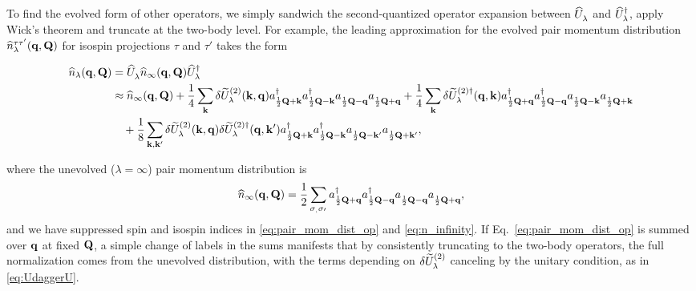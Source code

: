 \documentclass[10pt,aps,prc,floatfix,twocolumn,nofootinbib]{revtex4-1}
\begin{document}
To find the evolved form of other operators, we simply sandwich the second-quantized operator expansion between $\Uhatlam$ and $\widehat U_{\lambda}^{\dagger}$, apply Wick's theorem and truncate at the two-body level.
%
For example, the leading approximation for the evolved pair momentum distribution $\widehat{n}_{\lambda}^{\tau\tau'}(\mathbf{q},\mathbf{Q})$ for isospin projections $\tau$ and $\tau'$ takes the form
\begin{widetext}
%
\begin{align} \label{eq:pair_mom_dist_op}
     \nhatlo(\qvec,\Qvec) &=
    \Uhatlam\nhathi(\qvec,\Qvec)\Uhatlamdag \notag \\
    &\approx \nhathi(\qvec,\Qvec) 
    + \frac14\sum_{\kvec} \delUtilde^{(2)}_\lambda(\kvec,\qvec)
    \akdag_{\frac{1}{2}\Qvec + \kvec} \akdag_{\frac{1}{2}\Qvec - \kvec} 
    \ak_{\frac{1}{2}\Qvec - \qvec} \ak_{\frac{1}{2}\Qvec + \qvec}
    + \frac14\sum_{\kvec} \delUtilde^{(2)\dagger}_\lambda(\qvec,\kvec)
    \akdag_{\frac{1}{2}\Qvec + \qvec} \akdag_{\frac{1}{2}\Qvec - \qvec} 
    \ak_{\frac{1}{2}\Qvec - \kvec} \ak_{\frac{1}{2}\Qvec + \kvec} \notag \\
    & \quad \null + \frac18 \sum_{\kvec,\kvec'} \delUtilde^{(2)}_\lambda(\kvec,\qvec)\delUtilde^{(2)\dagger}_\lambda(\qvec,\kvec')
    \akdag_{\frac{1}{2}\Qvec + \kvec} \akdag_{\frac{1}{2}\Qvec - \kvec} 
    \ak_{\frac{1}{2}\Qvec - \kvec'} \ak_{\frac{1}{2}\Qvec + \kvec'},
\end{align}
\end{widetext}
%
where the unevolved ($\lambda = \infty$) pair momentum distribution is
%
\begin{equation} \label{eq:n_infinity}
    \nhathi(\qvec,\Qvec) = 
       \frac{1}{2}\sum_{\sg,\sg'} \akdag_{\frac{1}{2}\Qvec + \qvec} \akdag_{\frac{1}{2}\Qvec - \qvec} 
    \ak_{\frac{1}{2}\Qvec - \qvec} \ak_{\frac{1}{2}\Qvec + \qvec},
\end{equation}
%
and we have suppressed spin and isospin indices in \eqref{eq:pair_mom_dist_op} and \eqref{eq:n_infinity}.
If Eq.~\eqref{eq:pair_mom_dist_op} is summed over $\mathbf{q}$ at fixed $\mathbf{Q}$, a simple change of labels in the sums manifests that by consistently truncating to the two-body operators, the full normalization comes from the unevolved distribution, with the terms depending on $\delta \widetilde U^{(2)}_\lambda$ canceling by the unitary condition, as in \eqref{eq:UdaggerU}. 
%
\end{document}
